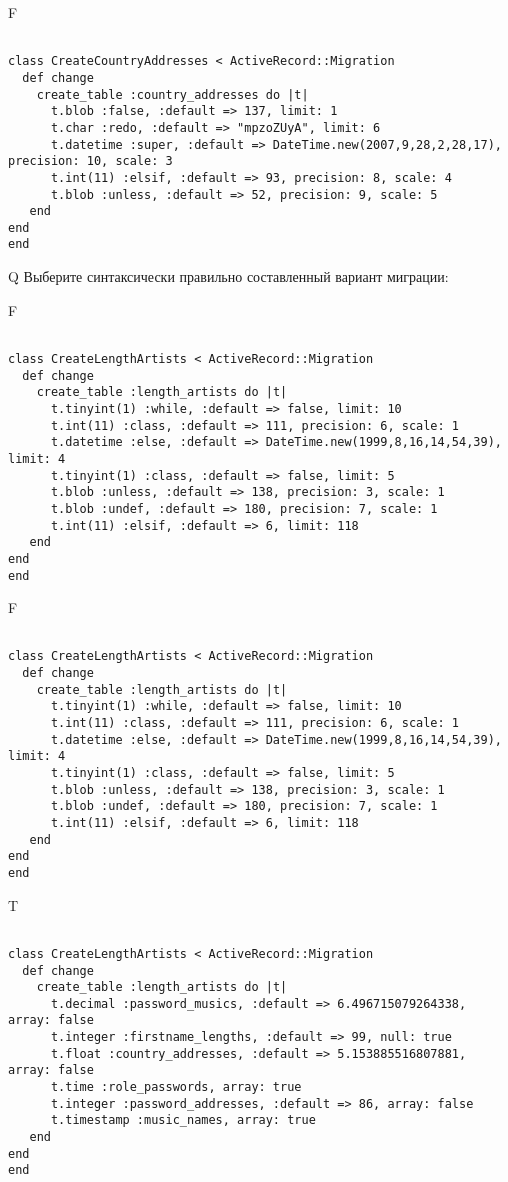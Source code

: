 F
\begin{verbatim}
		
class CreateCountryAddresses < ActiveRecord::Migration 
  def change 
    create_table :country_addresses do |t| 
      t.blob :false, :default => 137, limit: 1
      t.char :redo, :default => "mpzoZUyA", limit: 6
      t.datetime :super, :default => DateTime.new(2007,9,28,2,28,17), precision: 10, scale: 3
      t.int(11) :elsif, :default => 93, precision: 8, scale: 4
      t.blob :unless, :default => 52, precision: 9, scale: 5
   end
end
end
\end{verbatim}

Q
Выберите синтаксически правильно составленный вариант миграции:

F
\begin{verbatim}
		
class CreateLengthArtists < ActiveRecord::Migration 
  def change 
    create_table :length_artists do |t| 
      t.tinyint(1) :while, :default => false, limit: 10
      t.int(11) :class, :default => 111, precision: 6, scale: 1
      t.datetime :else, :default => DateTime.new(1999,8,16,14,54,39), limit: 4
      t.tinyint(1) :class, :default => false, limit: 5
      t.blob :unless, :default => 138, precision: 3, scale: 1
      t.blob :undef, :default => 180, precision: 7, scale: 1
      t.int(11) :elsif, :default => 6, limit: 118
   end
end
end
\end{verbatim}

F
\begin{verbatim}
		
class CreateLengthArtists < ActiveRecord::Migration 
  def change 
    create_table :length_artists do |t| 
      t.tinyint(1) :while, :default => false, limit: 10
      t.int(11) :class, :default => 111, precision: 6, scale: 1
      t.datetime :else, :default => DateTime.new(1999,8,16,14,54,39), limit: 4
      t.tinyint(1) :class, :default => false, limit: 5
      t.blob :unless, :default => 138, precision: 3, scale: 1
      t.blob :undef, :default => 180, precision: 7, scale: 1
      t.int(11) :elsif, :default => 6, limit: 118
   end
end
end
\end{verbatim}

T
\begin{verbatim}
		
class CreateLengthArtists < ActiveRecord::Migration 
  def change 
    create_table :length_artists do |t| 
      t.decimal :password_musics, :default => 6.496715079264338, array: false
      t.integer :firstname_lengths, :default => 99, null: true
      t.float :country_addresses, :default => 5.153885516807881, array: false
      t.time :role_passwords, array: true
      t.integer :password_addresses, :default => 86, array: false
      t.timestamp :music_names, array: true
   end
end
end
\end{verbatim}

